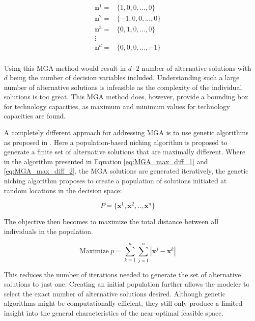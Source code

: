 \begin{equation*}
\begin{split}
\mathbf{n}^1 =& \{1,0,0,...,0  \} \\
\mathbf{n}^2 =& \{-1,0,0,...,0  \} \\
\mathbf{n}^3 =& \{0,1,0,...,0  \} \\
\vdots& \\
\mathbf{n}^d =& \{0,0,0,...,-1  \} \\
\end{split}
\end{equation*}

Using this MGA method would result in $d\cdot2$ number of alternative solutions with $d$ being the number of decision variables included. Understanding such a large number of alternative solutions is infeasible as the complexity of the individual solutions is too great. This MGA method does, however, provide a bounding box for technology capacities, as maximum and minimum values for technology capacities are found. 

A completely different approach for addressing MGA is to use genetic algorithms as proposed in \cite{Genetic_Algorithms_for_MGA}. Here a population-based niching algorithm is proposed to generate a finite set of alternative solutions that are maximally different. Where in the algorithm presented in Equation \ref{eq:MGA_max_diff_1} and \ref{eq:MGA_max_diff_2}, the MGA solutions are generated iteratively, the genetic niching algorithm proposes to create a population of solutions initiated at random locations in the decision space:

\begin{equation}
P = \{\mathbf{x}^1,\mathbf{x}^2,..,\mathbf{x}^n \}
\end{equation}

The objective then becomes to maximize the total distance between all individuals in the population. 

\begin{equation}
\text{Maximize}    \; p = \sum_{k=1}^{n} \sum_{j=1}^{n} |\mathbf{x}^j - \mathbf{x}^k|
\end{equation}

This reduces the number of iterations needed to generate the set of alternative solutions to just one. Creating an initial population further allows the modeler to select the exact number of alternative solutions desired. 
Although genetic algorithms might be computationally efficient, they still only produce a limited insight into the general characteristics of the near-optimal feasible space. 

